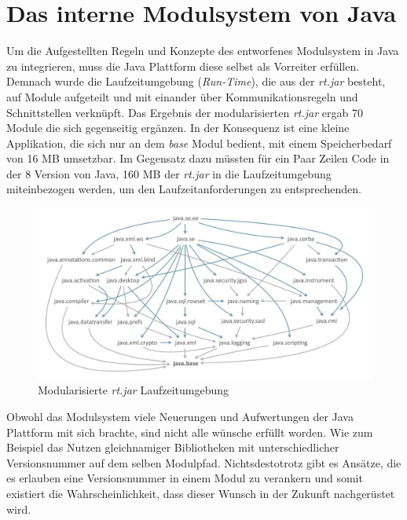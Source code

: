 \section{Das interne Modulsystem von Java} \label{sec:modular_java_base}
  Um die Aufgestellten Regeln und Konzepte des entworfenes Modulsystem in Java zu integrieren, muss die Java Plattform diese selbst als Vorreiter erfüllen. \bigbreak
  Demnach wurde die Laufzeitumgebung (\textit{Run-Time}), die aus der \textit{rt.jar} besteht, auf Module aufgeteilt und mit einander über Kommunikationsregeln und Schnittstellen verknüpft. Das Ergebnis der modularisierten \textit{rt.jar} ergab 70 Module die sich gegenseitig ergänzen. \newline
  In der Konsequenz ist eine kleine Applikation, die sich nur an dem \textit{base} Modul bedient, mit einem Speicherbedarf von 16 MB umsetzbar. Im Gegensatz dazu müssten für ein Paar Zeilen Code in der 8 Version von Java, 160 MB der \textit{rt.jar} in die Laufzeitumgebung miteinbezogen werden, um den Laufzeitanforderungen zu entsprechenden.\bigbreak
  \begin{figure}[h!]
   \centering
   \includegraphics[width=\textwidth]{material/images/moduleGraph.jpg}
   \caption{Modularisierte \textit{rt.jar} Laufzeitumgebung \cite{modGraph}}
   \label{fig:jdk}
  \end{figure}
  Obwohl das Modulsystem viele Neuerungen und Aufwertungen der Java Plattform mit sich brachte, sind nicht alle wünsche erfüllt worden. Wie zum Beispiel das Nutzen gleichnamiger Bibliotheken mit unterschiedlicher Versionsnummer auf dem selben Modulpfad.\newline
  Nichtsdestotrotz gibt es Ansätze, die es erlauben eine Versionsnummer in einem Modul zu verankern und somit existiert die Wahrscheinlichkeit, dass dieser Wunsch in der Zukunft nachgerüstet wird. 
 

